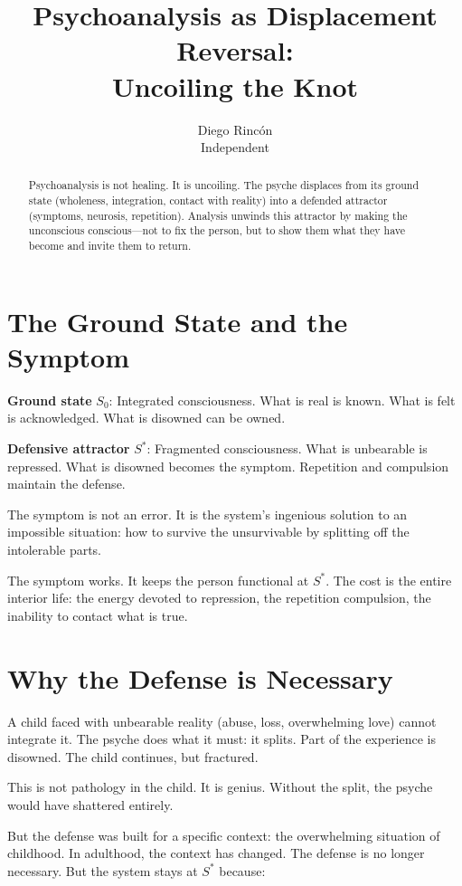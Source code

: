 \documentclass[12pt]{article}
\title{Psychoanalysis as Displacement Reversal:\\
Uncoiling the Knot}
\author{Diego Rincón\\
\small Independent}
\date{}
\begin{document}
\maketitle

\begin{abstract}
Psychoanalysis is not healing. It is uncoiling. The psyche displaces from its ground state (wholeness, integration, contact with reality) into a defended attractor (symptoms, neurosis, repetition). Analysis unwinds this attractor by making the unconscious conscious—not to fix the person, but to show them what they have become and invite them to return.
\end{abstract}

\section{The Ground State and the Symptom}

\textbf{Ground state} $S_0$: Integrated consciousness. What is real is known. What is felt is acknowledged. What is disowned can be owned.

\textbf{Defensive attractor} $S^*$: Fragmented consciousness. What is unbearable is repressed. What is disowned becomes the symptom. Repetition and compulsion maintain the defense.

The symptom is not an error. It is the system's ingenious solution to an impossible situation: how to survive the unsurvivable by splitting off the intolerable parts.

The symptom works. It keeps the person functional at $S^*$. The cost is the entire interior life: the energy devoted to repression, the repetition compulsion, the inability to contact what is true.

\section{Why the Defense is Necessary}

A child faced with unbearable reality (abuse, loss, overwhelming love) cannot integrate it. The psyche does what it must: it splits. Part of the experience is disowned. The child continues, but fractured.

This is not pathology in the child. It is genius. Without the split, the psyche would have shattered entirely.

But the defense was built for a specific context: the overwhelming situation of childhood. In adulthood, the context has changed. The defense is no longer necessary. But the system stays at $S^*$ because:
\end{document}
